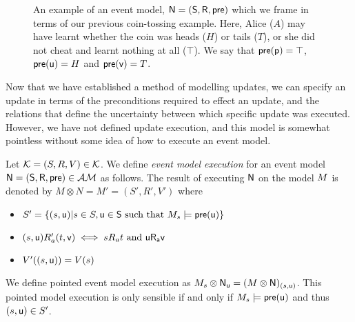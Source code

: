 \begin{figure}
\centering
{}
\caption{An example of an event model, $\mathrm{\mathsf{N}} = (\mathrm{\mathsf{S}},\mathrm{\mathsf{R}},\mathrm{\mathsf{pre}})$ which we frame in terms of our previous coin-tossing example.
Here, Alice ($A$) may have learnt whether the coin was heads ($H$) or tails ($T$), or she did not
cheat and learnt nothing at all ($\top$).
We say that $\mathrm{\mathsf{pre}}(\mathrm{\mathsf{p}}) = \top$, $\mathrm{\mathsf{pre}}(\mathrm{\mathsf{u}}) = H$ and $\mathrm{\mathsf{pre}}(\mathrm{\mathsf{v}}) = T$.}
\label{figure:eventModelExample}
\end{figure}

Now that we have established a method of modelling updates, we can specify an update in terms of the
preconditions required to effect an update, and the relations that define the uncertainty between
which specific update was executed.
However, we have not defined update execution, and this model is somewhat pointless without some
idea of how to execute an event model.

\begin{defn} \label{evModelEx}
	Let $\mathcal{K} = (S, R, V) \in \mathcal{K}$. We define {\em event model
	execution} for an event model $\mathrm{\mathsf{\mathrm{\mathsf{N}} = (S,
		R, pre)}} \in
\mathcal{AM}$ as follows.
The result of executing $\mathrm{\mathsf{N}}$ on the model $M$ is denoted by $M \otimes N = M' = (S', R', V')$ where
\begin{itemize}
	\item $S' = \{(s,\mathrm{\mathsf{u}}) | s \in S, \mathrm{\mathsf{u \in
    S}} \text{ such that } M_s \models \mathrm{\mathsf{pre(u)}}\}$
	\item $(s, \mathrm{\mathsf{u}}) R_a' (t, \mathrm{\mathsf{v}}) \iff s R_a t \text{ and } \mathrm{\mathsf{u R_a v}}$
	\item $V'((s,\mathrm{\mathsf{u}})) = V(s)$
\end{itemize}
We define pointed event model execution as $M_s \otimes
\mathrm{\mathsf{\mathrm{\mathsf{N}}_u}}
= (M \otimes \mathrm{\mathsf{\mathrm{\mathsf{N}}}})_{(s, \mathrm{\mathsf{u}})}$.
This pointed model execution is only sensible if and only if $M_s \models
\mathrm{\mathsf{pre(u)}}$ and thus $(s,\mathrm{\mathsf{u}})
	\in S'$.
\end{defn}

